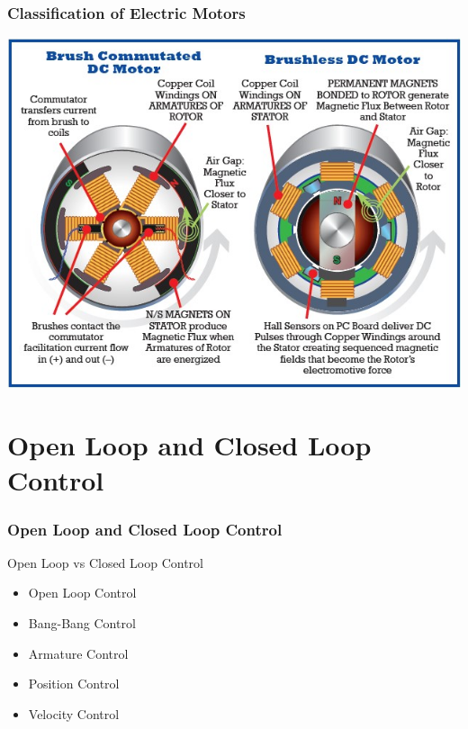 \documentclass[fleqn]{beamer} %
\newcommand{\sectiontitleI}{Classification of Electric Motors}
\newcommand{\sectiontitleII}{Open Loop and Closed Loop Control}
\begin{document}
	\begin{frame}[label=sectionI] \small
		\frametitle{\sectiontitleI}	
		
		\includegraphics[scale=0.5]{images/brushed_brushless.jpg}

	\end{frame}


\section{\sectiontitleII}	

	\begin{frame} \small
		\frametitle{\sectiontitleII}

		Open Loop vs Closed Loop Control
		\begin{itemize}
			\item Open Loop Control
			\item Bang-Bang Control
			\item Armature Control
			\item Position Control
			\item Velocity Control
		\end{itemize}

	\end{frame}
\end{document}
